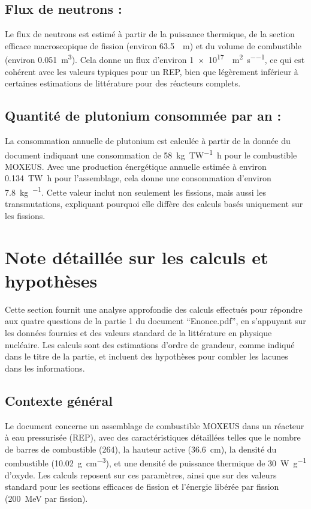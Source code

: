\documentclass[12pt,a4paper]{article}
\begin{document}
\subsection*{Flux de neutrons :}
Le flux de neutrons est estimé à partir de la puissance thermique, de la section efficace macroscopique de fission (environ \SI{63,5}{\per\meter}) et du volume de combustible (environ \SI{0,051}{\cubic\meter}). Cela donne un flux d'environ \SI{1e17}{\neutron\per\meter\squared\per\second}, ce qui est cohérent avec les valeurs typiques pour un REP, bien que légèrement inférieur à certaines estimations de littérature pour des réacteurs complets.

\subsection*{Quantité de plutonium consommée par an :}
La consommation annuelle de plutonium est calculée à partir de la donnée du document indiquant une consommation de \SI{58}{\kilogram\per\tera\watt\hour} pour le combustible MOXEUS. Avec une production énergétique annuelle estimée à environ \SI{0,134}{\tera\watt\hour} pour l'assemblage, cela donne une consommation d'environ \SI{7,8}{\kilogram\per\year}. Cette valeur inclut non seulement les fissions, mais aussi les transmutations, expliquant pourquoi elle diffère des calculs basés uniquement sur les fissions.

\section*{Note détaillée sur les calculs et hypothèses}

Cette section fournit une analyse approfondie des calculs effectués pour répondre aux quatre questions de la partie 1 du document ``Enonce.pdf'', en s'appuyant sur les données fournies et des valeurs standard de la littérature en physique nucléaire. Les calculs sont des estimations d'ordre de grandeur, comme indiqué dans le titre de la partie, et incluent des hypothèses pour combler les lacunes dans les informations.

\subsection*{Contexte général}
Le document concerne un assemblage de combustible MOXEUS dans un réacteur à eau pressurisée (REP), avec des caractéristiques détaillées telles que le nombre de barres de combustible (264), la hauteur active (\SI{36,6}{\centi\meter}), la densité du combustible (\SI{10,02}{\gram\per\cubic\centi\meter}), et une densité de puissance thermique de \SI{30}{\watt\per\gram} d'oxyde. Les calculs reposent sur ces paramètres, ainsi que sur des valeurs standard pour les sections efficaces de fission et l'énergie libérée par fission (\SI{200}{\mega\electronvolt} par fission).
\end{document}
